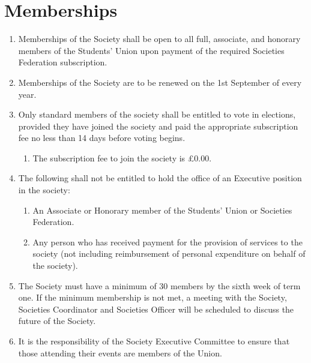 \documentclass[a4paper,11pt,parskip=half-]{scrartcl} %
\begin{document}
\section{Memberships}
\begin{enumerate}
    \item Memberships of the Society shall be open to all full, associate, and honorary members of the Students' Union upon payment of the required Societies Federation subscription.
    \item Memberships of the Society are to be renewed on the 1st September of every year.
    \item Only standard members of the society shall be entitled to vote in elections, provided they have joined the society and paid the appropriate subscription fee no less than 14 days before voting begins.
    \begin{enumerate}
        \item The subscription fee to join the society is £0.00.
    \end{enumerate}
    \item The following shall not be entitled to hold the office of an Executive position in the society:
    \begin{enumerate}
        \item An Associate or Honorary member of the Students' Union or Societies Federation.
        \item Any person who has received payment for the provision of services to the society (not including reimbursement of personal expenditure on behalf of the society).
    \end{enumerate}
    \item The Society must have a minimum of 30 members by the sixth week of term one. If the minimum membership is not met, a meeting with the Society, Societies Coordinator and Societies Officer will be scheduled to discuss the future of the Society.
    \item It is the responsibility of the Society Executive Committee to ensure that those attending their events are members of the Union.
\end{enumerate}
\end{document}
